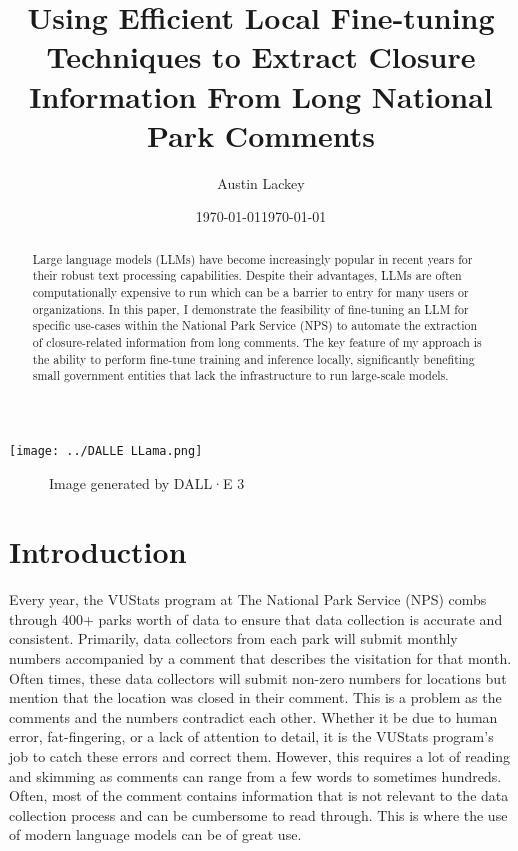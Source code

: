 \documentclass[12pt]{article}
\date{\today}
\title{\textbf{Using Efficient Local Fine-tuning Techniques to Extract Closure Information From Long National Park Comments}}
\author{Austin Lackey}
\date{\today}
\begin{document}
\maketitle
\vspace{-1cm}
\begin{abstract}
    \normalsize
    Large language models (LLMs) have become increasingly popular in recent years for their robust text processing capabilities. Despite their advantages, LLMs are often computationally expensive to run which can be a barrier to entry for many users or organizations. In this paper, I demonstrate the feasibility of fine-tuning an LLM for specific use-cases within the National Park Service (NPS) to automate the extraction of closure-related information from long comments. The key feature of my approach is the ability to perform fine-tune training and inference locally, significantly benefiting small government entities that lack the infrastructure to run large-scale models. 
\end{abstract}

\begin{center}
    \texttt{[image: ../DALLE LLama.png]}
    \begin{figure}[H]
        \caption{Image generated by DALL·E 3 \cite{dalle3}}
    \end{figure}
\end{center}

\section{Introduction}
Every year, the VUStats program at The National Park Service (NPS) combs through 400+ parks worth of data to ensure that data collection is accurate and consistent. Primarily, data collectors from each park will submit monthly numbers accompanied by a comment that describes the visitation for that month. Often times, these data collectors will submit non-zero numbers for locations but mention that the location was closed in their comment. This is a problem as the comments and the numbers contradict each other. Whether it be due to human error, fat-fingering, or a lack of attention to detail, it is the VUStats program's job to catch these errors and correct them. However, this requires a lot of reading and skimming as comments can range from a few words to sometimes hundreds. Often, most of the comment contains information that is not relevant to the data collection process and can be cumbersome to read through. This is where the use of modern language models can be of great use.
\end{document}
